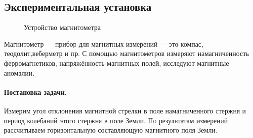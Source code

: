 \documentclass{physlab}
\begin{document}
	\subsection*{Экспериментальная установка}
	\begin{figure}[h]
		\begin{minipage}[h]{0.5\linewidth}
		\end{minipage}
		\begin{minipage}[h]{0.5\linewidth}
		\end{minipage}
		\caption{Устройство магнитометра}
		\label{ris:station}
	\end{figure}
	Магнитометр — прибор для магнитных измерений — это компас, теодолит,веберметр и пр. С помощью магнитометров измеряют намагниченность ферромагнетиков, напряжённость магнитных полей, исследуют магнитные аномалии.\\
	\paragraph{Постановка задачи.} Измерим угол отклонения магнитной стрелки в поле намагниченного стержня и период колебаний этого стержня в поле Земли. По результатам измерений рассчитываем горизонтальную составляющую магнитного поля Земли.
\end{document}
